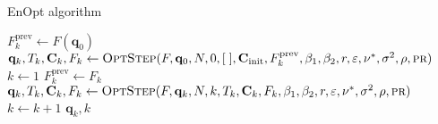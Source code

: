 \begin{algorithm}[H]%
\caption{EnOpt algorithm}
\begin{algorithmic}[1]
\State $F^\mathrm{prev}_{k}\gets F(\mathbf{q}_0)$
\State $\mathbf{q}_k,T_k,\mathbf{C}_k,F_k\gets\Call{OptStep}{F,\mathbf{q}_0,N,0,[\;],\mathbf{C}_\mathrm{init},F^\mathrm{prev}_{k},\beta_1,\beta_2,r,\varepsilon,\nu^*,\sigma^2,\rho,\textproc{pr}}$
\State $k\gets 1$
\State $F^\mathrm{prev}_k\gets F_k$
\State $\mathbf{q}_{k},T_{k},\mathbf{C}_k,F_{k}\gets\Call{OptStep}{F,\mathbf{q}_k,N,k,T_k,\mathbf{C}_k,F_k,\beta_1,\beta_2,r,\varepsilon,\nu^*,\sigma^2,\rho,\textproc{pr}}$
\State $k\gets k+1$
\EndWhile
\State \Return $\mathbf{q}_k, k$
\EndFunction
\end{algorithmic}
\end{algorithm}

